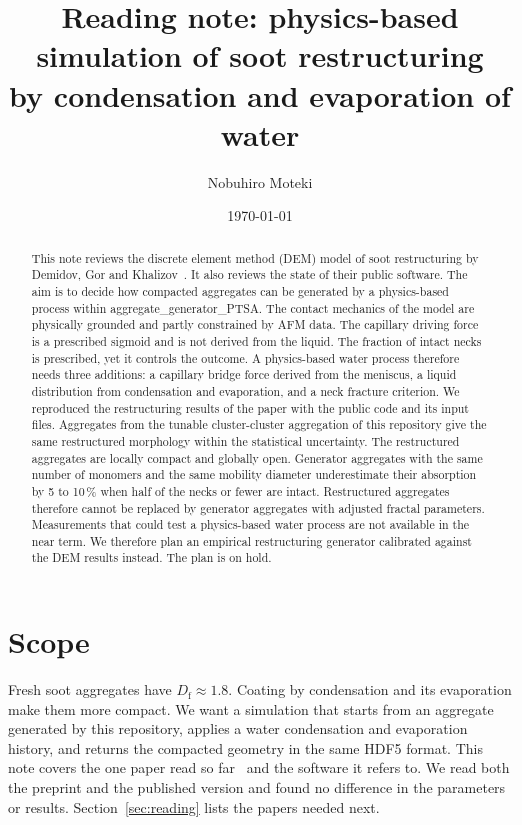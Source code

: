 \documentclass[11pt,a4paper]{article}
\title{Reading note: physics-based simulation of soot restructuring\\
by condensation and evaporation of water}
\author{Nobuhiro Moteki}
\date{\today}
\newcommand{\Df}{D_\text{f}}
\begin{document}
\maketitle

\begin{abstract}
This note reviews the discrete element method (DEM) model of soot restructuring by Demidov, Gor and Khalizov~\cite{demidov2024}.
It also reviews the state of their public software.
The aim is to decide how compacted aggregates can be generated by a physics-based process within aggregate\_generator\_PTSA.
The contact mechanics of the model are physically grounded and partly constrained by AFM data.
The capillary driving force is a prescribed sigmoid and is not derived from the liquid.
The fraction of intact necks is prescribed, yet it controls the outcome.
A physics-based water process therefore needs three additions: a capillary bridge force derived from the meniscus, a liquid distribution from condensation and evaporation, and a neck fracture criterion.
We reproduced the restructuring results of the paper with the public code and its input files.
Aggregates from the tunable cluster-cluster aggregation of this repository give the same restructured morphology within the statistical uncertainty.
The restructured aggregates are locally compact and globally open.
Generator aggregates with the same number of monomers and the same mobility diameter underestimate their absorption by 5 to 10\,\% when half of the necks or fewer are intact.
Restructured aggregates therefore cannot be replaced by generator aggregates with adjusted fractal parameters.
Measurements that could test a physics-based water process are not available in the near term.
We therefore plan an empirical restructuring generator calibrated against the DEM results instead.
The plan is on hold.
\end{abstract}

\section{Scope}
\label{sec:scope}

Fresh soot aggregates have $\Df \approx 1.8$.
Coating by condensation and its evaporation make them more compact.
We want a simulation that starts from an aggregate generated by this repository, applies a water condensation and evaporation history, and returns the compacted geometry in the same HDF5 format.
This note covers the one paper read so far~\cite{demidov2024} and the software it refers to.
We read both the preprint and the published version and found no difference in the parameters or results.
Section~\ref{sec:reading} lists the papers needed next.
\end{document}
